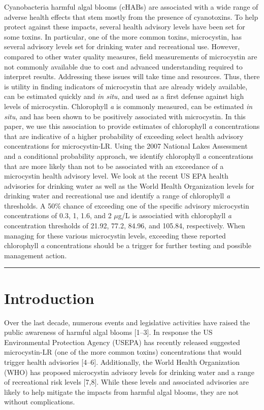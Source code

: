 \documentclass[11pt,]{article}
\begin{document}
Cyanobacteria harmful algal blooms (cHABs) are associated with a wide
range of adverse health effects that stem mostly from the presence of
cyanotoxins. To help protect against these impacts, several health
advisory levels have been set for some toxins. In particular, one of the
more common toxins, microcystin, has several advisory levels set for
drinking water and recreational use. However, compared to other water
quality measures, field measurements of microcystin are not commonly
available due to cost and advanced understanding required to interpret
results. Addressing these issues will take time and resources. Thus,
there is utility in finding indicators of microcystin that are already
widely available, can be estimated quickly and \emph{in situ}, and used
as a first defense against high levels of microcystin. Chlorophyll
\emph{a} is commonly measured, can be estimated \emph{in situ}, and has
been shown to be positively associated with microcystin. In this paper,
we use this association to provide estimates of chlorophyll \emph{a}
concentrations that are indicative of a higher probability of exceeding
select health advisory concentrations for microcystin-LR. Using the 2007
National Lakes Assessment and a conditional probability approach, we
identify chlorophyll \emph{a} concentrations that are more likely than
not to be associated with an exceedance of a microcystin health advisory
level. We look at the recent US EPA health advisories for drinking water
as well as the World Health Organization levels for drinking water and
recreational use and identify a range of chlorophyll \emph{a}
thresholds. A 50\% chance of exceeding one of the specific advisory
microcystin concentrations of 0.3, 1, 1.6, and 2 \(\mu\)g/L is
associatied with chlorophyll \emph{a} concentration thresholds of 21.92,
77.2, 84.96, and 105.84, respectively. When managing for these various
microcystin levels, exceeding these reported chlorophyll \emph{a}
concentrations should be a trigger for further testing and possible
management action.

\vspace{3mm}

\hrule

\doublespace

\section{Introduction}\label{introduction}

Over the last decade, numerous events and legislative activities have
raised the public awareness of harmful algal blooms {[}1--3{]}. In
response the US Environmental Protection Agency (USEPA) has recently
released suggested microcystin-LR (one of the more common toxins)
concentrations that would trigger health advisories {[}4--6{]}.
Additionally, the World Health Organization (WHO) has proposed
microcystin advisory levels for drinking water and a range of
recreational risk levels {[}7,8{]}. While these levels and associated
advisories are likely to help mitigate the impacts from harmful algal
blooms, they are not without complications.
\end{document}
